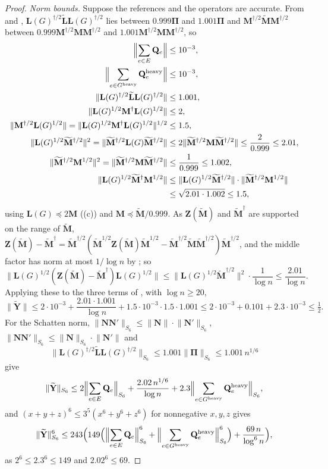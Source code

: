 \documentclass[11pt]{article}
\theoremstyle{remark}
\newcommand{\LL}{\mathbf L}
\newcommand{\LLtil}{{\widetilde{\LL}}}
\newcommand{\MM}{\mathbf M}
\newcommand{\MMtil}{{\widetilde{\MM}}}
\newcommand{\NN}{\mathbf N}
\newcommand{\PPi}{{\boldsymbol\Pi}}
\newcommand{\QQ}{\mathbf Q}
\newcommand{\YY}{\mathbf{Y}}
\newcommand{\YYtil}{{\widetilde{\YY}}}
\newcommand{\ZZ}{\mathbf Z}
\newcommand{\Gh}{G^{\mathrm{heavy}}}
\newcommand{\norm}[1]{\lVert#1\rVert}
\begin{document}
\begin{proof}
\emph{Norm bounds.}
Suppose the references and the operators are accurate.
From  and ,
$\LL(G)^{\dag/2}\LLtil\LL(G)^{\dag/2}$ lies between $0.999\PPi$ and
$1.001\PPi$ and $\MM^{\dag/2}\MMtil\MM^{\dag/2}$ between
$0.999\MM^{\dag/2}\MM\MM^{\dag/2}$ and $1.001\MM^{\dag/2}\MM\MM^{\dag/2}$,
so
\begin{align*}
\Bigl\|\sum_{e\in E}\QQ_e\Bigr\|&\le10^{-3},\\
\Bigl\|\sum_{e\in\Gh}\QQ^{\mathrm{heavy}}_e\Bigr\|&\le10^{-3},\\
\norm{\LL(G)^{\dag/2}\LLtil\LL(G)^{\dag/2}}&\le1.001,\\
\norm{\LL(G)^{1/2}\MM^{\dag}\LL(G)^{1/2}}&\le2,\\
\norm{\MM^{\dag/2}\LL(G)^{1/2}}=\norm{\LL(G)^{1/2}\MM^{\dag}\LL(G)^{1/2}}^{1/2}&\le1.5,\\
\norm{\LL(G)^{1/2}\MMtil^{\dag/2}}^{2}=\norm{\MMtil^{\dag/2}\LL(G)\MMtil^{\dag/2}}
&\le2\norm{\MMtil^{\dag/2}\MM\MMtil^{\dag/2}}\le\frac{2}{0.999}\le2.01,\\
\norm{\MMtil^{\dag/2}\MM^{1/2}}^{2}=\norm{\MMtil^{\dag/2}\MM\MMtil^{\dag/2}}&\le\frac1{0.999}\le1.002,\\
\norm{\LL(G)^{1/2}\MMtil^{\dag}\MM^{1/2}}
&\le\norm{\LL(G)^{1/2}\MMtil^{\dag/2}}\cdot\norm{\MMtil^{\dag/2}\MM^{1/2}}\\
&\le\sqrt{2.01\cdot1.002}\le1.5,
\end{align*}
using $\LL(G)\preceq2\MM$ ((c)) and $\MM\preceq\MMtil/0.999$.
As $\ZZ(\MMtil)$ and $\MMtil^{\dag}$ are supported on the range of $\MMtil$,
$\ZZ(\MMtil)-\MMtil^{\dag}=\MMtil^{\dag/2}(\MMtil^{1/2}\ZZ(\MMtil)\MMtil^{1/2}-\MMtil^{\dag/2}\MMtil\MMtil^{\dag/2})\MMtil^{\dag/2}$,
and the middle factor has norm at most $1/\log n$ by ; so
\[
\norm{\LL(G)^{1/2}(\ZZ(\MMtil)-\MMtil^{\dag})\LL(G)^{1/2}}
\le\norm{\LL(G)^{1/2}\MMtil^{\dag/2}}^{2}\cdot\frac1{\log n}\le\frac{2.01}{\log n}.
\]
Applying these to the three terms of , with $\log n\ge20$,
\[
\norm{\YYtil}\le2\cdot10^{-3}+\frac{2.01\cdot1.001}{\log n}+1.5\cdot10^{-3}\cdot1.5\cdot1.001
\le2\cdot10^{-3}+0.101+2.3\cdot10^{-3}\le\tfrac12 .
\]
For the Schatten norm, $\norm{\NN\NN'}_{S_6}\le\norm{\NN}\cdot\norm{\NN'}_{S_6}$,
$\norm{\NN\NN'}_{S_6}\le\norm{\NN}_{S_6}\cdot\norm{\NN'}$ and
\[
\norm{\LL(G)^{\dag/2}\LLtil\LL(G)^{\dag/2}}_{S_6}\le1.001\norm{\PPi}_{S_6}\le1.001\,n^{1/6}
\]
give
\[
\norm{\YYtil}_{S_6}
\le2\Bigl\|\sum_{e\in E}\QQ_e\Bigr\|_{S_6}
+\frac{2.02\,n^{1/6}}{\log n}
+2.3\Bigl\|\sum_{e\in\Gh}\QQ^{\mathrm{heavy}}_e\Bigr\|_{S_6},
\]
and $(x+y+z)^{6}\le3^{5}(x^{6}+y^{6}+z^{6})$ for nonnegative $x,y,z$ gives
\begin{equation}\label{eq:S6}
\norm{\YYtil}_{S_6}^{6}
\le243\Bigl(149\Bigl(\Bigl\|\sum_{e\in E}\QQ_e\Bigr\|_{S_6}^{6}
+\Bigl\|\sum_{e\in\Gh}\QQ^{\mathrm{heavy}}_e\Bigr\|_{S_6}^{6}\Bigr)
+\frac{69\,n}{\log^{6}n}\Bigr),
\end{equation}
as $2^{6}\le2.3^{6}\le149$ and $2.02^{6}\le69$.


\end{proof}
\end{document}

